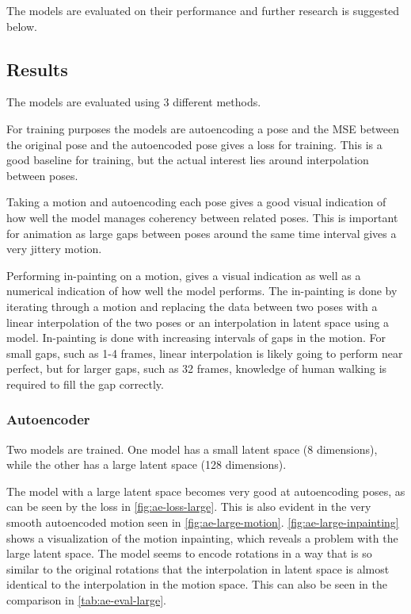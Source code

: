 The models are evaluated on their performance and further research is suggested below.

\subsection{Results}\label{subsec:results}
The models are evaluated using 3 different methods.

For training purposes the models are autoencoding a pose and the MSE between the original pose and the autoencoded pose gives a loss for training. This is a good baseline for training, but the actual interest lies around interpolation between poses.

Taking a motion and autoencoding each pose gives a good visual indication of how well the model manages coherency between related poses. This is important for animation as large gaps between poses around the same time interval gives a very jittery motion.

Performing in-painting on a motion, gives a visual indication as well as a numerical indication of how well the model performs. The in-painting is done by iterating through a motion and replacing the data between two poses with a linear interpolation of the two poses or an interpolation in latent space using a model. In-painting is done with increasing intervals of gaps in the motion. For small gaps, such as 1-4 frames, linear interpolation is likely going to perform near perfect, but for larger gaps, such as 32 frames, knowledge of human walking is required to fill the gap correctly.

\subsubsection{Autoencoder}\label{subsubsec:ae}
Two models are trained. One model has a small latent space (8 dimensions), while the other has a large latent space (128 dimensions).

The model with a large latent space becomes very good at autoencoding poses, as can be seen by the loss in \autoref{fig:ae-loss-large}. This is also evident in the very smooth autoencoded motion seen in \autoref{fig:ae-large-motion}. \autoref{fig:ae-large-inpainting} shows a visualization of the motion inpainting, which reveals a problem with the large latent space. The model seems to encode rotations in a way that is so similar to the original rotations that the interpolation in latent space is almost identical to the interpolation in the motion space. This can also be seen in the comparison in \autoref{tab:ae-eval-large}.

